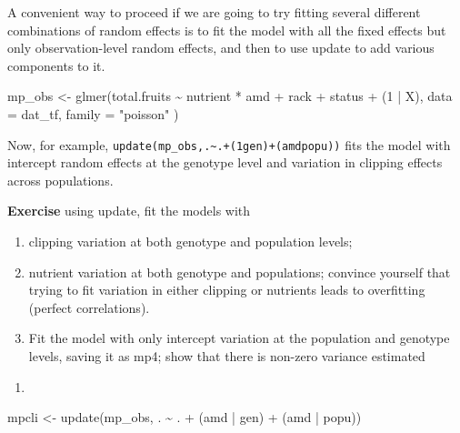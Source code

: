 \documentclass[
  12pt,
]{book}
\makeatletter
\newenvironment{Shaded}{\begin{snugshade}}{\end{snugshade}}
\newcommand{\AttributeTok}[1]{\textcolor[rgb]{0.77,0.63,0.00}{#1}}
\newcommand{\DecValTok}[1]{\textcolor[rgb]{0.00,0.00,0.81}{#1}}
\newcommand{\FunctionTok}[1]{\textcolor[rgb]{0.00,0.00,0.00}{#1}}
\newcommand{\NormalTok}[1]{#1}
\newcommand{\OtherTok}[1]{\textcolor[rgb]{0.56,0.35,0.01}{#1}}
\newcommand{\SpecialCharTok}[1]{\textcolor[rgb]{0.00,0.00,0.00}{#1}}
\newcommand{\StringTok}[1]{\textcolor[rgb]{0.31,0.60,0.02}{#1}}
\providecommand{\tightlist}{%
  \setlength{\itemsep}{0pt}\setlength{\parskip}{0pt}}
\newenvironment{kframe}{%
\medskip{}
\setlength{\fboxsep}{.8em}
\def\at@end@of@kframe{}%
\ifinner\ifhmode%
 \def\at@end@of@kframe{\end{minipage}}%
 \begin{minipage}{\columnwidth}%
\fi\fi%
\def\FrameCommand##1{\hskip\@totalleftmargin \hskip-\fboxsep
\colorbox{incolor}{##1}\hskip-\fboxsep
    \hskip-\linewidth \hskip-\@totalleftmargin \hskip\columnwidth}%
\MakeFramed {\advance\hsize-\width
  \@totalleftmargin\z@ \linewidth\hsize
  \@setminipage}}%
{\par\unskip\endMakeFramed%
\at@end@of@kframe}
\newenvironment{rmdblock}[1]
 {
 \begin{itemize}
 \renewcommand{\labelitemi}{
   \raisebox{-.7\height}[0pt][0pt]{
     {\setkeys{Gin}{width=3em,keepaspectratio}\texttt{[image: images/icons/\#1]}}
   }
 }
 \begin{kframe}
 \setlength{\fboxsep}{1em}
 \item
 }
 {
 \end{kframe}
 \end{itemize}
 }
\newenvironment{rmdcode}
  {\begin{rmdblock}{code}}
  {\end{rmdblock}}
\makeatother
\begin{document}
A convenient way to proceed if we are going to try fitting several different combinations of random effects is to fit the model with all the fixed effects but only observation-level random effects, and then to use update to add various components to it.

\begin{Shaded}
\begin{Highlighting}[]
\NormalTok{mp\_obs }\OtherTok{\textless{}{-}} \FunctionTok{glmer}\NormalTok{(total.fruits }\SpecialCharTok{\textasciitilde{}}\NormalTok{ nutrient }\SpecialCharTok{*}\NormalTok{ amd }\SpecialCharTok{+}
\NormalTok{  rack }\SpecialCharTok{+}\NormalTok{ status }\SpecialCharTok{+}
\NormalTok{  (}\DecValTok{1} \SpecialCharTok{|}\NormalTok{ X),}
\AttributeTok{data =}\NormalTok{ dat\_tf, }\AttributeTok{family =} \StringTok{"poisson"}
\NormalTok{)}
\end{Highlighting}
\end{Shaded}

Now, for example, \texttt{update(mp\_obs,.\textasciitilde{}.+(1\textbar{}gen)+(amd\textbar{}popu))} fits the model with intercept random effects at the genotype level and variation in clipping effects across populations.

\begin{rmdcode}
\textbf{Exercise} using update, fit the models with

\begin{enumerate}
\def\labelenumi{\arabic{enumi}.}
\tightlist
\item
  clipping variation at both genotype and population levels;
\item
  nutrient variation at both genotype and populations; convince yourself that trying to fit variation in either clipping or nutrients leads to overfitting (perfect correlations).
\item
  Fit the model with only intercept variation at the population and genotype levels, saving it as mp4; show that there is non-zero variance estimated
\end{enumerate}
\end{rmdcode}

\begin{enumerate}
\def\labelenumi{\arabic{enumi}.}
\tightlist
\item
\end{enumerate}

\begin{Shaded}
\begin{Highlighting}[]
\NormalTok{mpcli }\OtherTok{\textless{}{-}} \FunctionTok{update}\NormalTok{(mp\_obs, . }\SpecialCharTok{\textasciitilde{}}\NormalTok{ . }\SpecialCharTok{+}\NormalTok{ (amd }\SpecialCharTok{|}\NormalTok{ gen) }\SpecialCharTok{+}\NormalTok{ (amd }\SpecialCharTok{|}\NormalTok{ popu))}
\end{Highlighting}
\end{Shaded}
\end{document}
